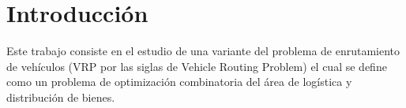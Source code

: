 \chapter*{Introducción} \label{chap:intro}

 Este trabajo consiste en el estudio de una variante del problema de enrutamiento de vehículos (VRP por las siglas de Vehicle Routing Problem) el cual se define como un problema de optimización combinatoria del área de logística y distribución de bienes.\\
 


